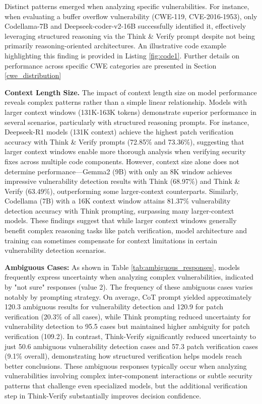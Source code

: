 \documentclass[sigconf]{acmart}
\begin{document}
Distinct patterns emerged when analyzing specific vulnerabilities. For instance, when evaluating a buffer overflow vulnerability (CWE-119, CVE-2016-1953), only Codellama-7B and Deepseek-coder-v2-16B successfully identified it, effectively leveraging structured reasoning via the Think \& Verify prompt despite not being primarily reasoning-oriented architectures. An illustrative code example highlighting this finding is provided in Listing \ref{fig:code1}. Further details on performance across specific CWE categories are presented in Section \ref{cwe_distribution}
    
\textbf{Context Length Size.} The impact of context length size on model performance reveals complex patterns rather than a simple linear relationship. Models with larger context windows (131K-163K tokens) demonstrate superior performance in several scenarios, particularly with structured reasoning prompts. For instance, Deepseek-R1 models (131K context) achieve the highest patch verification accuracy with Think \& Verify prompts (72.85\% and 73.36\%), suggesting that larger context windows enable more thorough analysis when verifying security fixes across multiple code components. However, context size alone does not determine performance—Gemma2 (9B) with only an 8K window achieves impressive vulnerability detection results with Think (68.97\%) and Think \& Verify (63.49\%), outperforming some larger-context counterparts. Similarly, Codellama (7B) with a 16K context window attains 81.37\% vulnerability detection accuracy with Think prompting, surpassing many larger-context models. These findings suggest that while larger context windows generally benefit complex reasoning tasks like patch verification, model architecture and training can sometimes compensate for context limitations in certain vulnerability detection scenarios.
    
\textbf{Ambiguous Cases:} As shown in Table \ref{tab:ambiguous_responses}, models frequently express uncertainty when analyzing complex vulnerabilities, indicated by "not sure" responses (value 2). The frequency of these ambiguous cases varies notably by prompting strategy. On average, CoT prompt yielded approximately 120.3 ambiguous results for vulnerability detection and 120.9 for patch verification (20.3\% of all cases), while Think prompting reduced uncertainty for vulnerability detection to 95.5 cases but maintained higher ambiguity for patch verification (109.2). In contrast, Think-Verify significantly reduced uncertainty to just 50.6 ambiguous vulnerability detection cases and 57.3 patch verification cases (9.1\% overall), demonstrating how structured verification helps models reach better conclusions. These ambiguous responses typically occur when analyzing vulnerabilities involving complex inter-component interactions or subtle security patterns that challenge even specialized models, but the additional verification step in Think-Verify substantially improves decision confidence.
\end{document}
